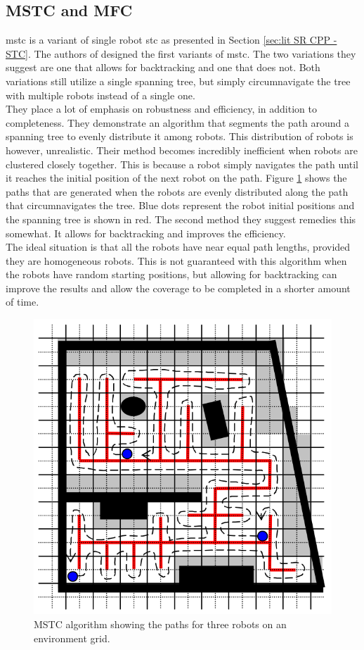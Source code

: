 	\subsection{MSTC and MFC} 
	\acf{mstc} is a variant of single robot \acf{stc} as presented in Section \ref{sec:lit SR CPP - STC}. The authors of \cite{Hazon2005} designed the first variants of \acs{mstc}. The two variations they suggest are one that allows for backtracking and one that does not. Both variations still utilize a single spanning tree, but simply circumnavigate the tree with multiple robots instead of a single one.\\
	They place a lot of emphasis on robustness and efficiency, in addition to completeness. They demonstrate an algorithm that segments the path around a spanning tree to evenly distribute it among robots. This distribution of robots is however, unrealistic. Their method becomes incredibly inefficient when robots are clustered closely together. This is because a robot simply navigates the path until it reaches the initial position of the next robot on the path. Figure \ref{fig:MSTC} shows the paths that are generated when the robots are evenly distributed along the path that circumnavigates the tree. Blue dots represent the robot initial positions and the spanning tree is shown in red. The second method they suggest remedies this somewhat. It allows for backtracking and improves the efficiency.\\
	The ideal situation is that all the robots have near equal path lengths, provided they are homogeneous robots. This is not guaranteed with this algorithm when the robots have random starting positions, but allowing for backtracking can improve the results and allow the coverage to be completed in a shorter amount of time.
	\begin{figure}[h!]
		\centering
		\includegraphics[scale=0.4]{figs/MSTC-Graphic}
		\caption{MSTC algorithm showing the paths for three robots on an environment grid. \cite{Hazon2005}}
		\label{fig:MSTC}
	\end{figure}
	
